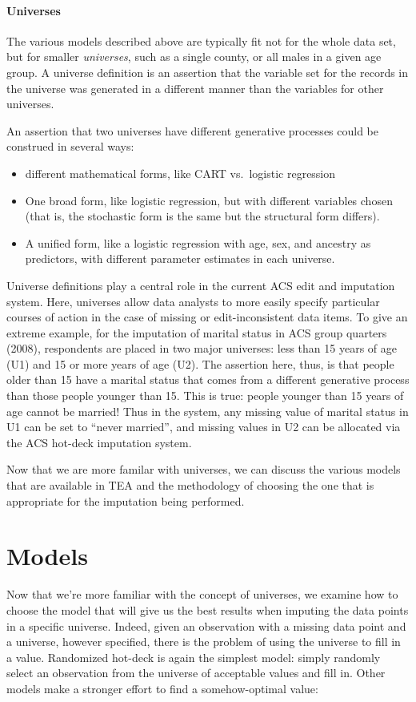 \documentclass{article}
\def\tighten{ \setlength{\itemsep}{1pt}
    \setlength{\parskip}{0pt}}
\begin{document}
\paragraph{Universes}
The various models described above are typically fit not for the whole data set, but for
smaller {\em universes}, such as a single county, or all males in a given age group.
A universe definition is an assertion that the variable set for the records in the
universe was generated in a different manner than the variables for other universes.

An assertion that two universes have different generative processes could be construed in
several ways:

\begin{itemize}\tighten
\item different mathematical forms, like CART vs.\ logistic regression
\item One broad form, like logistic regression, but with different variables chosen
    (that is, the stochastic form is the same but the structural form differs).
\item A unified form, like a logistic regression with age, sex, and ancestry
    as predictors, with different parameter estimates in each universe.
\end{itemize}

Universe definitions play a central role in the current ACS edit and imputation system.
Here, universes allow data analysts to more easily specify particular courses of
action in the case of missing or edit-inconsistent data items. To give an extreme example, for the imputation of marital status in ACS group quarters (2008), respondents are placed
in two major universes: less than 15 years of age (U1) and 15 or more years of age
(U2). The assertion here, thus, is that people older than 15 have a marital status
that comes from a different generative process than those people younger than 15.
This is true: people younger than 15 years of age cannot be married!  Thus in the
system, any missing value of marital status in U1 can be set to ``never married'',
and missing values in U2 can be allocated via the ACS hot-deck imputation system.

Now that we are more familar with universes, we can discuss the various models that are 
available in TEA and the methodology of choosing the one that is appropriate for the 
imputation being performed.


\section{Models}
Now that we're more familiar with the concept of universes, we examine how to choose the 
model that will give us the best results when imputing the data points in a specific universe.
Indeed, given an observation with a missing data point and a universe, however specified, there is
the problem of using the universe to fill in a value. Randomized hot-deck is again
the simplest model: simply randomly select an observation from the universe of acceptable
values and fill in. Other models make a stronger effort to find a somehow-optimal value:\\
\end{document}
